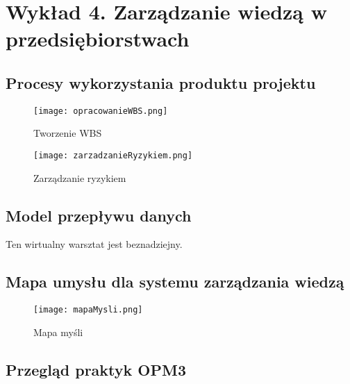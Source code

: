 ﻿\chapter{Wykład 4. Zarządzanie wiedzą w przedsiębiorstwach}

\section{Procesy wykorzystania produktu projektu}

\begin{figure}[hbt]
\centering
\texttt{[image: opracowanieWBS.png]}
\caption{Tworzenie WBS}
\label{fig:opracowanieWBS}
\end{figure}

\begin{figure}[hbt]
\centering
\texttt{[image: zarzadzanieRyzykiem.png]}
\caption{Zarządzanie ryzykiem}
\label{fig:zarzadzanieRyzykiem}
\end{figure}


\section{Model przepływu danych}

Ten wirtualny warsztat jest beznadziejny.


\section{Mapa umysłu dla systemu zarządzania wiedzą}

\begin{figure}[hbt]
\centering
\texttt{[image: mapaMysli.png]}
\caption{Mapa myśli}
\label{fig:mapaMysli}
\end{figure}


\section{Przegląd praktyk OPM3}

